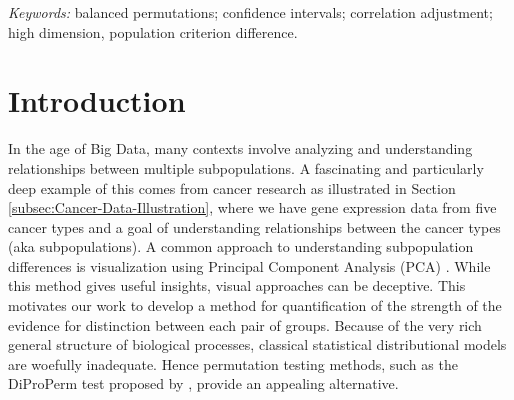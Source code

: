 \documentclass[12pt]{article}
\begin{document}
\noindent%
{\it Keywords:} balanced permutations; confidence intervals; correlation adjustment; high dimension, population criterion difference.

\section{Introduction}
\label{intro}
In the age of Big Data, many contexts involve analyzing and understanding
relationships between multiple subpopulations. A fascinating and particularly
deep example of this comes from cancer research as illustrated in
Section \ref{subsec:Cancer-Data-Illustration}, where we have gene expression data from five cancer types and a goal of understanding relationships between the cancer types (aka subpopulations). A common approach to
understanding subpopulation differences is visualization using Principal Component Analysis (PCA) \citet{jolliffe1986principal}. While this method gives useful insights, visual approaches can be deceptive. This motivates our work to develop a method for quantification of the strength of the evidence for distinction between each pair of groups. 
Because of the very rich general structure of biological processes, classical
statistical distributional models are woefully inadequate. Hence permutation
testing methods, such as the DiProPerm test proposed by \citet{wei2016direction}, provide an appealing alternative. %
\end{document}
